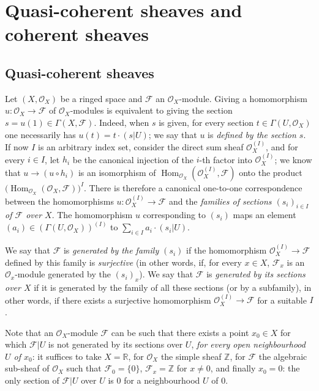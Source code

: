 \section{Quasi-coherent sheaves and coherent sheaves}
\label{section:0.5}

\subsection{Quasi-coherent sheaves}
\label{subsection:0.5.1}

\begin{env}[5.1.1]
\label{0.5.1.1}
Let $(X,\mathcal{O}_X)$ be a ringed space and $\mathcal{F}$ an
$\mathcal{O}_X$-module. Giving a homomorphism
$u:\mathcal{O}_X\to\mathcal{F}$ of $\mathcal{O}_X$-modules is equivalent to giving
the section $s=u(1)\in\Gamma(X,\mathcal{F})$. Indeed, when $s$ is
given, for every section $t\in\Gamma(U,\mathcal{O}_X)$ one necessarily has
$u(t)=t\cdot(s|U)$; we say that $u$ is \emph{defined by the section $s$}. If
now $I$ is an arbitrary index set, consider the direct sum
sheaf $\mathcal{O}_X^{(I)}$, and for every $i\in I$, let $h_i$ be
the canonical injection of the $i$-th factor into $\mathcal{O}_X^{(I)}$; we know
that $u\to(u\circ h_i)$ is an isomorphism of
$\operatorname{Hom}_{\mathcal{O}_X}(\mathcal{O}_X^{(I)},\mathcal{F})$ onto the
product
$\bigl(\operatorname{Hom}_{\mathcal{O}_X}(\mathcal{O}_X,\mathcal{F})\bigr)^I$.
There is therefore a canonical one-to-one correspondence between the homomorphisms
$u:\mathcal{O}_X^{(I)}\to\mathcal{F}$ and the \emph{families of sections
$(s_i)_{i\in I}$ of $\mathcal{F}$ over $X$}. The homomorphism $u$
corresponding to $(s_i)$ maps an element
$(a_i)\in(\Gamma(U,\mathcal{O}_X))^{(I)}$ to
$\sum_{i\in I}a_i\cdot(s_i|U)$.

We say that $\mathcal{F}$ is \emph{generated by the family $(s_i)$} if
the homomorphism $\mathcal{O}_X^{(I)}\to\mathcal{F}$ defined
by this family is \emph{surjective} (in other words, if, for every
$x\in X$, $\mathcal{F}_x$ is an $\mathcal{O}_x$-module generated by the
$(s_i)_x$). We say that $\mathcal{F}$ is \emph{generated by its sections
over $X$} if it is generated by the family of all these sections (or
by a subfamily), in other words, if there exists a surjective homomorphism
$\mathcal{O}_X^{(I)}\to\mathcal{F}$ for a suitable $I$.

Note that an $\mathcal{O}_X$-module $\mathcal{F}$ can be such that there
exists a point $x_0\in X$ for which $\mathcal{F}|U$ is not generated by
its sections over $U$, \emph{for every open neighbourhood $U$ of
$x_0$}: it suffices to take $X=\mathbb{R}$, for $\mathcal{O}_X$ the simple
sheaf $\mathbb{Z}$, for $\mathcal{F}$ the algebraic sub-sheaf of
$\mathcal{O}_X$ such that $\mathcal{F}_0=\{0\}$, $\mathcal{F}_x=\mathbb{Z}$ for
$x\ne0$, and finally $x_0=0$: the only section of $\mathcal{F}|U$ over
$U$ is $0$ for a neighbourhood $U$ of $0$.
\end{env}

